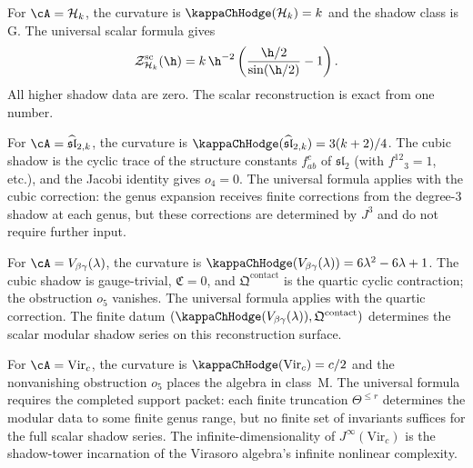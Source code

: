 \begin{proposition}
For $\cA = \mathcal{H}_k$, the curvature is
\(\kappaChHodge(\mathcal H_k)=k\) and the
shadow class is G. The universal scalar formula gives
\[
\mathcal Z^{\mathrm{sc}}_{\mathcal{H}_k}(\h)
=
k\,\h^{-2}\left(\frac{\h/2}{\sin(\h/2)}-1\right).
\]
All higher shadow data are zero. The scalar reconstruction is exact from one number.
\end{proposition}

\begin{proposition}
For $\cA = \widehat{\mathfrak{sl}}_{2,k}$, the curvature is
\(\kappaChHodge(\widehat{\mathfrak{sl}}_{2,k})=3(k+2)/4\).
The cubic shadow is the cyclic trace of the
structure constants $f^c_{ab}$ of $\mathfrak{sl}_2$ (with
$f^{12}{}_3 = 1$, etc.), and the Jacobi identity gives $o_4 = 0$.
The universal formula applies with the cubic correction: the genus
expansion receives finite corrections from the degree-$3$ shadow
at each genus, but these corrections are determined by $J^3$ and do not require
further input.
\end{proposition}

\begin{proposition}
For $\cA = V_{\beta\gamma}(\lambda)$, the curvature is
\(\kappaChHodge(V_{\beta\gamma}(\lambda))
=6\lambda^2 - 6\lambda + 1\). The cubic shadow is
gauge-trivial, $\mathfrak{C}=0$, and
$\mathfrak{Q}^{\mathrm{contact}}$ is the quartic cyclic contraction;
the obstruction $o_5$ vanishes. The universal formula applies with
the quartic correction.
The finite datum
\((\kappaChHodge(V_{\beta\gamma}(\lambda)),
\mathfrak{Q}^{\mathrm{contact}})\) determines the scalar modular
shadow series on this reconstruction surface.
\end{proposition}

\begin{proposition}
For $\cA = \mathrm{Vir}_c$, the curvature is
\(\kappaChHodge(\mathrm{Vir}_c)=c/2\) and the
nonvanishing obstruction $o_5$ places the algebra in class~M. The
universal formula requires the completed support packet: each finite truncation
$\Theta^{\leq r}$ determines the modular data to some finite genus range, but
no finite set of invariants suffices for the full scalar shadow series. The
infinite-dimensionality of $J^\infty(\mathrm{Vir}_c)$ is the shadow-tower
incarnation of the Virasoro algebra's infinite nonlinear complexity.
\end{proposition}


